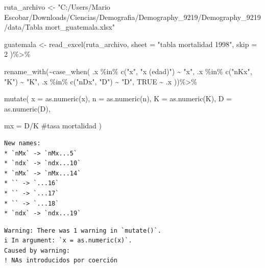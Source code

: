 \documentclass[
  letterpaper,
  DIV=11,
  numbers=noendperiod]{scrartcl}
\newenvironment{Shaded}{\begin{snugshade}}{\end{snugshade}}
\newcommand{\AttributeTok}[1]{\textcolor[rgb]{0.40,0.45,0.13}{#1}}
\newcommand{\CommentTok}[1]{\textcolor[rgb]{0.37,0.37,0.37}{#1}}
\newcommand{\ConstantTok}[1]{\textcolor[rgb]{0.56,0.35,0.01}{#1}}
\newcommand{\DecValTok}[1]{\textcolor[rgb]{0.68,0.00,0.00}{#1}}
\newcommand{\FunctionTok}[1]{\textcolor[rgb]{0.28,0.35,0.67}{#1}}
\newcommand{\NormalTok}[1]{\textcolor[rgb]{0.00,0.23,0.31}{#1}}
\newcommand{\OtherTok}[1]{\textcolor[rgb]{0.00,0.23,0.31}{#1}}
\newcommand{\SpecialCharTok}[1]{\textcolor[rgb]{0.37,0.37,0.37}{#1}}
\newcommand{\StringTok}[1]{\textcolor[rgb]{0.13,0.47,0.30}{#1}}
\begin{document}
\begin{Shaded}
\begin{Highlighting}[]
\NormalTok{ruta\_archivo }\OtherTok{\textless{}{-}} \StringTok{"C:/Users/Mario Escobar/Downloads/Ciencias/Demografia/Demography\_9219/Demography\_9219/data/Tabla mort\_guatemala.xlsx"}

\NormalTok{guatemala }\OtherTok{\textless{}{-}} \FunctionTok{read\_excel}\NormalTok{(ruta\_archivo, }
                        \AttributeTok{sheet =} \StringTok{"tabla mortalidad 1998"}\NormalTok{,}
                        \AttributeTok{skip =} \DecValTok{2}
\NormalTok{                        )}\SpecialCharTok{\%\textgreater{}\%}
  
  \FunctionTok{rename\_with}\NormalTok{(}\SpecialCharTok{\textasciitilde{}}\FunctionTok{case\_when}\NormalTok{(}
\NormalTok{    .x }\SpecialCharTok{\%in\%} \FunctionTok{c}\NormalTok{(}\StringTok{"x"}\NormalTok{, }\StringTok{"x (edad)"}\NormalTok{) }\SpecialCharTok{\textasciitilde{}} \StringTok{"x"}\NormalTok{,}
\NormalTok{    .x }\SpecialCharTok{\%in\%} \FunctionTok{c}\NormalTok{(}\StringTok{"nKx"}\NormalTok{, }\StringTok{"K"}\NormalTok{) }\SpecialCharTok{\textasciitilde{}} \StringTok{"K"}\NormalTok{,}
\NormalTok{    .x }\SpecialCharTok{\%in\%} \FunctionTok{c}\NormalTok{(}\StringTok{"nDx"}\NormalTok{, }\StringTok{"D"}\NormalTok{) }\SpecialCharTok{\textasciitilde{}} \StringTok{"D"}\NormalTok{,}
    \ConstantTok{TRUE} \SpecialCharTok{\textasciitilde{}}\NormalTok{ .x}
\NormalTok{  ))}\SpecialCharTok{\%\textgreater{}\%}

  \FunctionTok{mutate}\NormalTok{(}
    \AttributeTok{x =} \FunctionTok{as.numeric}\NormalTok{(x),}
    \AttributeTok{n =} \FunctionTok{as.numeric}\NormalTok{(n),}
    \AttributeTok{K =} \FunctionTok{as.numeric}\NormalTok{(K),}
    \AttributeTok{D =} \FunctionTok{as.numeric}\NormalTok{(D),}
    
    \AttributeTok{mx =}\NormalTok{ D}\SpecialCharTok{/}\NormalTok{K }\CommentTok{\#tasa mortalidad}
\NormalTok{  )}
\end{Highlighting}
\end{Shaded}

\begin{verbatim}
New names:
* `nMx` -> `nMx...5`
* `ndx` -> `ndx...10`
* `nMx` -> `nMx...14`
* `` -> `...16`
* `` -> `...17`
* `` -> `...18`
* `ndx` -> `ndx...19`
\end{verbatim}

\begin{verbatim}
Warning: There was 1 warning in `mutate()`.
i In argument: `x = as.numeric(x)`.
Caused by warning:
! NAs introducidos por coerción
\end{verbatim}
\end{document}
